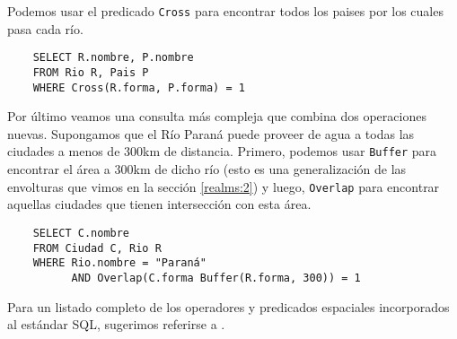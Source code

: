 Podemos usar el predicado \texttt{Cross} para encontrar todos los paises por los cuales pasa cada río.

\begin{verbatim}
    SELECT R.nombre, P.nombre
    FROM Rio R, Pais P
    WHERE Cross(R.forma, P.forma) = 1
\end{verbatim}

Por último veamos una consulta más compleja que combina dos operaciones nuevas. Supongamos que el Río Paraná puede proveer de agua a todas las ciudades a menos de 300km de distancia. Primero, podemos usar \texttt{Buffer} para encontrar el área a 300km de dicho río (esto es una generalización de las envolturas que vimos en la sección \ref{realms:2}) y luego, \texttt{Overlap} para encontrar aquellas ciudades que tienen intersección con esta área.

\begin{verbatim}
    SELECT C.nombre
    FROM Ciudad C, Rio R
    WHERE Rio.nombre = "Paraná"
          AND Overlap(C.forma Buffer(R.forma, 300)) = 1
\end{verbatim}

Para un listado completo de los operadores y predicados espaciales incorporados al estándar SQL, sugerimos referirse a \cite{99opengis}.




